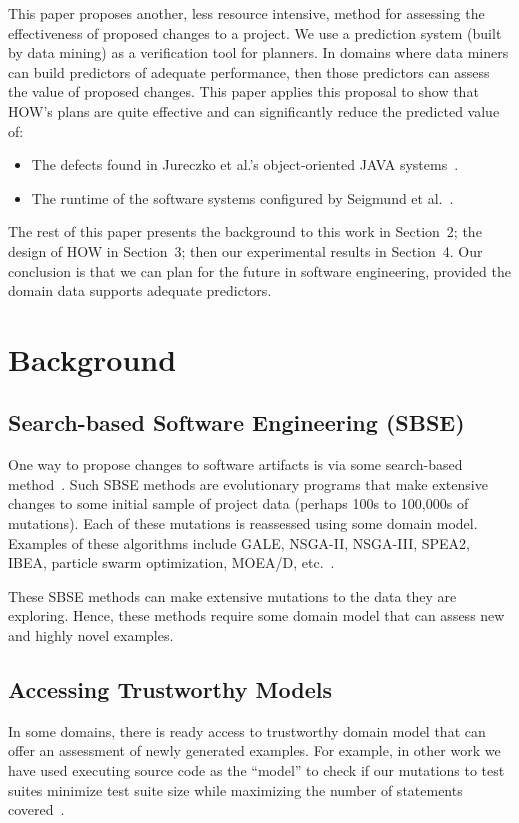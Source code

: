 \documentclass[conference]{IEEEtran}
\newcommand{\bi}{\begin{itemize}}
\newcommand{\ei}{\end{itemize}}
\begin{document}
This paper proposes another, less resource intensive,  method for assessing the effectiveness of proposed
changes to a project.  
We  use a prediction system (built by data mining) as a verification
tool for planners. In domains where  data miners can build
predictors of adequate performance, then those predictors can assess the value
of proposed changes.
This paper applies this proposal to show that   HOW's plans are quite effective and  can
 significantly reduce the  predicted
value of:
\bi
\item The  defects found  in Jureczko et al.'s    object-oriented JAVA systems~\cite{jureczko10}.
\item The runtime of the  software systems   configured by  Seigmund et al.~\cite{sven12}.
\ei 
The rest of this paper presents the background to this work in Section~2; the design of HOW in Section~3;
then our experimental results  in Section~4.  Our conclusion is that we can plan for the future in
software engineering, provided the domain data supports adequate predictors.


\section{Background}
\subsection{Search-based Software Engineering (SBSE)}
One way to propose changes to software artifacts
is   via some search-based method~\cite{Harman2009,Harman2011}. Such SBSE methods are   evolutionary programs that 
make
 extensive changes to  some initial sample of project data
 (perhaps 
100s to 100,000s of mutations). Each of these mutations
is reassessed using some domain model.
Examples of these algorithms include GALE, NSGA-II, NSGA-III, SPEA2, IBEA, particle swarm optimization, MOEA/D, etc.~\cite{krall14,deb00a,zit02,zit04,%
deb14,Cui2005a,zhang07:TEC}.


These SBSE methods can make extensive mutations to the data they are exploring. Hence, these methods
require some domain model that can assess new and highly novel examples.
 

\subsection{Accessing Trustworthy Models}

In some domains, there is ready access to 
trustworthy domain model that can offer an assessment
of newly generated examples. For example, in other work
we have used executing source code as the ``model'' to check
if our mutations to test suites
  minimize
test suite size while maximizing the number of statements covered~\cite{me09m,andrews07,andrews10}.
\end{document}
